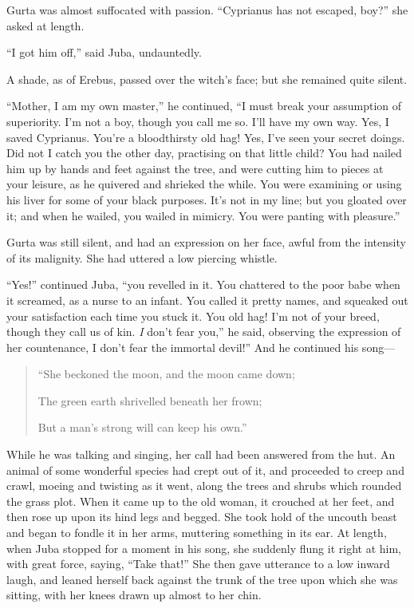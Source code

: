 Gurta was almost suffocated with passion. ``Cyprianus has not
escaped, boy?'' she asked at length.

``I got him off,'' said Juba, undauntedly.

A shade, as of Erebus, passed over the witch's face; but she
remained quite silent.

``Mother, I am my own master,'' he continued, ``I must
break your assumption of superiority. I'm not a boy, though you call
me so. I'll have my own way. Yes, I saved Cyprianus. You're a
bloodthirsty old hag! Yes, I've seen your secret doings. Did not I
catch you the other day, practising on that little child? You had
nailed him up by hands and feet against the tree, and were cutting him
to pieces at your leisure, as he quivered and shrieked the while. You
were examining or using his liver for some of your black purposes. It's
not in my line; but you gloated over it; and when he wailed, you
wailed in mimicry. You were panting with pleasure.''

Gurta was still silent, and had an expression on her face, awful
from the intensity of its malignity. She had uttered a low piercing
whistle.

``Yes!'' continued Juba, ``you revelled in it. You
chattered to the poor babe when it screamed, as a nurse to an infant.
You called it pretty names, and squeaked out your satisfaction each
time you stuck it. You old hag! I'm not of your breed, though they
call us of kin. \emph{I} don't fear you,'' he said, observing the expression of her countenance, I don't fear the immortal
devil!'' And he continued his song—

\begin{quote}

``She beckoned the moon, and the moon came down;

The green earth shrivelled beneath her frown;

But a man's strong will can keep his own.''

\end{quote}

While he was talking and singing, her call had been answered from
the hut. An animal of some wonderful species had crept out of it, and
proceeded to creep and crawl, moeing and twisting as it went, along
the trees and shrubs which rounded the grass plot. When it came up to
the old woman, it crouched at her feet, and then rose up upon its hind
legs and begged. She took hold of the uncouth beast and began to
fondle it in her arms, muttering something in its ear. At length, when
Juba stopped for a moment in his song, she suddenly flung it right at
him, with great force, saying, ``Take that!'' She then gave
utterance to a low inward laugh, and leaned herself back against the
trunk of the tree upon which she was sitting, with her knees drawn up
almost to her chin.

